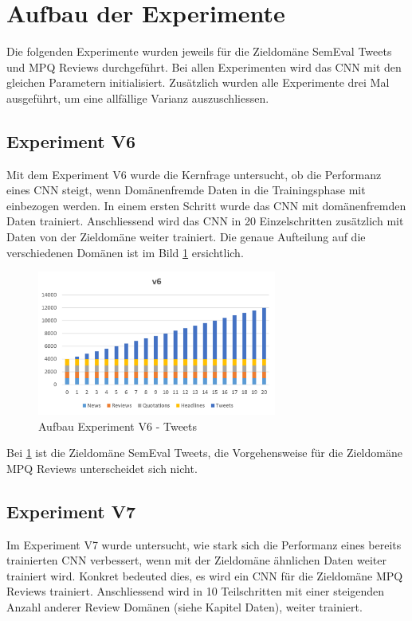 \section{Aufbau der Experimente}
\label{experiments}
Die folgenden Experimente wurden jeweils für die Zieldomäne SemEval Tweets und MPQ Reviews durchgeführt. Bei allen Experimenten wird das CNN mit den gleichen Parametern initialisiert. Zusätzlich wurden alle Experimente drei Mal ausgeführt, um eine allfällige Varianz auszuschliessen.
\subsection{Experiment V6}
Mit dem Experiment V6 wurde die Kernfrage untersucht, ob die Performanz eines CNN steigt, wenn Domänenfremde Daten in die Trainingsphase mit einbezogen werden.
In einem ersten Schritt wurde das CNN mit domänenfremden Daten trainiert. Anschliessend wird das CNN in 20 Einzelschritten zusätzlich mit Daten von der Zieldomäne weiter trainiert. Die genaue Aufteilung auf die verschiedenen Domänen ist im Bild \ref{fig:Method_V6} ersichtlich.
\begin{figure}[htbp]
	\centering
	\includegraphics[width=0.7\textwidth]{img/Method_V6}
	\caption{Aufbau Experiment V6 - Tweets}
	\label{fig:Method_V6}
\end{figure}
Bei \ref{fig:Method_V6} ist die Zieldomäne SemEval Tweets, die Vorgehensweise für die Zieldomäne MPQ Reviews unterscheidet sich nicht.
\subsection{Experiment V7}
Im Experiment V7 wurde untersucht, wie stark sich die Performanz eines bereits trainierten CNN verbessert, wenn mit der Zieldomäne ähnlichen Daten weiter trainiert wird. Konkret bedeuted dies, es wird ein CNN für die Zieldomäne MPQ Reviews trainiert. Anschliessend wird in 10 Teilschritten mit einer steigenden Anzahl anderer Review Domänen (siehe Kapitel Daten), weiter trainiert.


